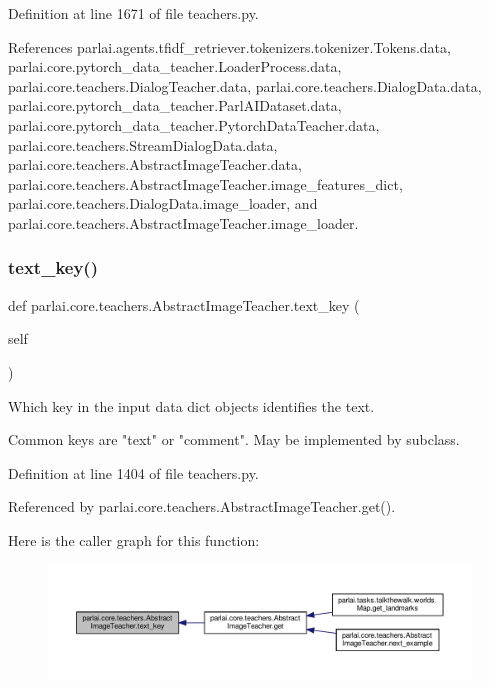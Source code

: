 Definition at line 1671 of file teachers.\+py.



References parlai.\+agents.\+tfidf\+\_\+retriever.\+tokenizers.\+tokenizer.\+Tokens.\+data, parlai.\+core.\+pytorch\+\_\+data\+\_\+teacher.\+Loader\+Process.\+data, parlai.\+core.\+teachers.\+Dialog\+Teacher.\+data, parlai.\+core.\+teachers.\+Dialog\+Data.\+data, parlai.\+core.\+pytorch\+\_\+data\+\_\+teacher.\+Parl\+A\+I\+Dataset.\+data, parlai.\+core.\+pytorch\+\_\+data\+\_\+teacher.\+Pytorch\+Data\+Teacher.\+data, parlai.\+core.\+teachers.\+Stream\+Dialog\+Data.\+data, parlai.\+core.\+teachers.\+Abstract\+Image\+Teacher.\+data, parlai.\+core.\+teachers.\+Abstract\+Image\+Teacher.\+image\+\_\+features\+\_\+dict, parlai.\+core.\+teachers.\+Dialog\+Data.\+image\+\_\+loader, and parlai.\+core.\+teachers.\+Abstract\+Image\+Teacher.\+image\+\_\+loader.

\mbox{\label{classparlai_1_1core_1_1teachers_1_1AbstractImageTeacher_a95e578f9650f77c1d397319b9050af51}} 
\subsubsection{\texorpdfstring{text\+\_\+key()}{text\_key()}}
{\footnotesize\ttfamily def parlai.\+core.\+teachers.\+Abstract\+Image\+Teacher.\+text\+\_\+key (\begin{DoxyParamCaption}\item[{}]{self }\end{DoxyParamCaption})}

\begin{DoxyVerb}Which key in the input data dict objects identifies the text.

Common keys are "text" or "comment". May be implemented by subclass.
\end{DoxyVerb}
 

Definition at line 1404 of file teachers.\+py.



Referenced by parlai.\+core.\+teachers.\+Abstract\+Image\+Teacher.\+get().

Here is the caller graph for this function\+:
\nopagebreak
\begin{figure}[H]
\begin{center}
\leavevmode
\includegraphics[width=350pt]{classparlai_1_1core_1_1teachers_1_1AbstractImageTeacher_a95e578f9650f77c1d397319b9050af51_icgraph}
\end{center}
\end{figure}


